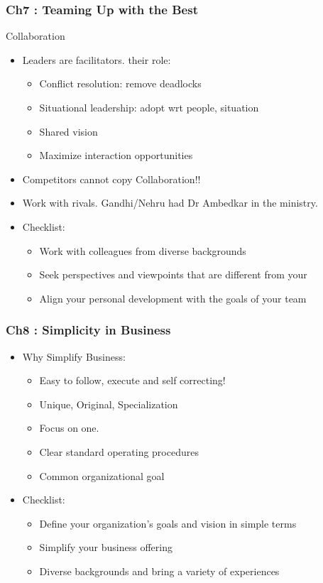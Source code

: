 \begin{frame}[fragile]\frametitle{Ch7 : Teaming Up with the Best}

Collaboration

\begin{itemize}
\item Leaders are facilitators. their role:
	\begin{itemize}
	\item Conflict resolution: remove deadlocks
	\item Situational leadership: adopt wrt people, situation
	\item Shared vision
	\item Maximize interaction opportunities
	\end{itemize}
\item Competitors cannot copy Collaboration!!
\item Work with rivals. Gandhi/Nehru had Dr Ambedkar in the ministry.
\item Checklist:
	\begin{itemize}
	\item  Work with colleagues from diverse backgrounds
	\item  Seek perspectives and viewpoints that are different from 
your
\item Align your personal development with the goals of your team
	\end{itemize}
\end{itemize}

\end{frame}

\begin{frame}[fragile]\frametitle{Ch8 : Simplicity in  Business}

\begin{itemize}
\item Why Simplify Business:
	\begin{itemize}
	\item Easy to follow, execute and self correcting!
	\item Unique, Original, Specialization
	\item Focus on one.
	\item Clear  standard operating procedures
	\item Common organizational goal
	\end{itemize}
\item Checklist:
	\begin{itemize}
	\item Define your organization’s goals and vision in simple terms
	\item Simplify your business offering
	\item Diverse backgrounds and bring a variety of experiences
	\end{itemize}
\end{itemize}

\end{frame}


